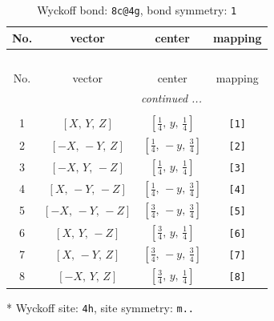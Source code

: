\documentclass[fleqn,8pt]{jsarticle}
\begin{document}
\renewcommand{\arraystretch}{1.2}
\begin{longtable}{cccc}
\caption{Wyckoff bond: {\tt 8c@4g}, bond symmetry: {\tt 1}}
 \\
 \hline \hline
No. & vector & center & mapping \\ \hline \endfirsthead

\multicolumn{3}{l}{\tablename\ \thetable{}} \\
 \hline \hline
No. & vector & center & mapping \\ \hline \endhead

 \hline \hline
\multicolumn{3}{r}{\footnotesize\it continued ...} \\ \endfoot

 \hline \hline
\multicolumn{3}{r}{} \\ \endlastfoot

1 & $\left[ X,\, Y,\, Z \right]$ & $\left[ \frac{1}{4},\, y,\, \frac{1}{4} \right]$ & {\tt [1]} \\ \hline
2 & $\left[ - X,\, - Y,\, Z \right]$ & $\left[ \frac{1}{4},\, - y,\, \frac{3}{4} \right]$ & {\tt [2]} \\ \hline
3 & $\left[ - X,\, Y,\, - Z \right]$ & $\left[ \frac{1}{4},\, y,\, \frac{1}{4} \right]$ & {\tt [3]} \\ \hline
4 & $\left[ X,\, - Y,\, - Z \right]$ & $\left[ \frac{1}{4},\, - y,\, \frac{3}{4} \right]$ & {\tt [4]} \\ \hline
5 & $\left[ - X,\, - Y,\, - Z \right]$ & $\left[ \frac{3}{4},\, - y,\, \frac{3}{4} \right]$ & {\tt [5]} \\ \hline
6 & $\left[ X,\, Y,\, - Z \right]$ & $\left[ \frac{3}{4},\, y,\, \frac{1}{4} \right]$ & {\tt [6]} \\ \hline
7 & $\left[ X,\, - Y,\, Z \right]$ & $\left[ \frac{3}{4},\, - y,\, \frac{3}{4} \right]$ & {\tt [7]} \\ \hline
8 & $\left[ - X,\, Y,\, Z \right]$ & $\left[ \frac{3}{4},\, y,\, \frac{1}{4} \right]$ & {\tt [8]} \\
\end{longtable}
* Wyckoff site: {\tt 4h}, site symmetry: {\tt m..}
\renewcommand{\arraystretch}{1.2}
\end{document}
